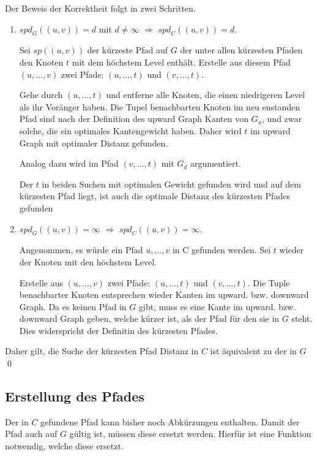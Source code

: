 \begin{beweis}\label{ch:proof:correct}
    Der Beweis der Korrektheit folgt in zwei Schritten.

    \begin{enumerate}
        \item
              ${spd}_G ((u, v)) = d$ mit $d \neq \infty$ $\Rightarrow$ ${spd}_C((u, v)) = d$.

              Sei ${sp}((u, v))$ der kürzeste Pfad auf $G$ der unter allen kürzesten Pfaden den Knoten $t$ mit dem höchstem Level enthält.
              Erstelle aus diesem Pfad $(u, \dotsc, v)$ zwei Pfade: $(u, \dotsc, t)$ und $(v, \dotsc, t)$.

              Gehe durch $(u, \dotsc, t)$ und entferne alle Knoten, die einen niedrigeren Level als ihr Voränger haben.
              Die Tupel benachbarten Knoten im neu enstanden Pfad sind nach der Definition des upward Graph Kanten von $G_u$, und zwar solche, die ein optimales Kantengewicht haben.
              Daher wird $t$ im upward Graph mit optimaler Distanz gefunden.

              Analog dazu wird im Pfad $(v, \dotsc, t)$ mit $G_d$ argumentiert.

              Der $t$ in beiden Suchen mit optimalen Gewicht gefunden wird und auf dem kürzesten Pfad liegt, ist auch die optimale Distanz des kürzesten Pfades gefunden

        \item
              ${spd}_G ((u, v)) = \infty$ $\Rightarrow$ ${spd}_C((u, v)) = \infty$.

              Angenommen, es würde ein Pfad ${u, \dotsc, v}$ in C gefunden werden.
              Sei $t$ wieder der Knoten mit den höchstem Level.

              Erstelle aus $(u, \dotsc, v)$ zwei Pfade: $(u, \dotsc, t)$ und $(v, \dotsc, t)$.
              Die Tuple benachbarter Knoten entsprechen wieder Kanten im upward. bzw. downward Graph.
              Da es keinen Pfad in $G$ gibt, muss es eine Kante im upward. bzw. downward Graph geben, welche kürzer ist, als der Pfad für den sie in $G$ steht.
              Dies widerspricht der Definitin des kürzesten Pfades.
    \end{enumerate}

    Daher gilt, die Suche der kürzesten Pfad Distanz in $C$ ist äquivalent zu der in $G$
    \qed
\end{beweis}

\subsection{Erstellung des Pfades}\label{ch:subsection:pfad_gewinnung}
Der in $C$ gefundene Pfad kann bisher noch Abkürzungen enthalten.
Damit der Pfad auch auf $G$ gültig ist, müssen diese ersetzt werden.
Hierfür ist eine Funktion notwendig, welche diese ersetzt.

